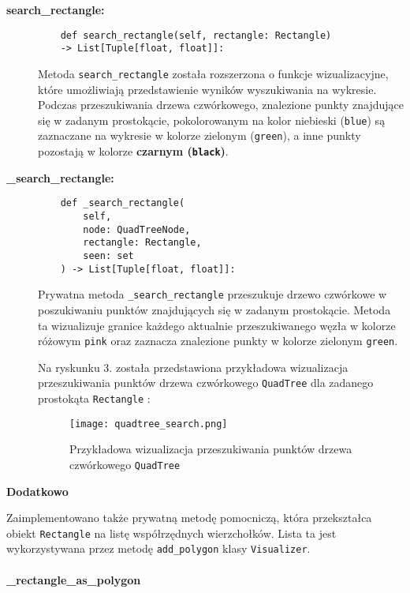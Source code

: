 \documentclass[12pt]{article}
\begin{document}
\begin{description}
    
    \item[\textbf{search\_rectangle:}]
    \begin{verbatim}
    def search_rectangle(self, rectangle: Rectangle)
    -> List[Tuple[float, float]]:
    \end{verbatim}
    Metoda \texttt{search\_rectangle} została rozszerzona o funkcje wizualizacyjne, które umożliwiają przedstawienie wyników wyszukiwania na wykresie. Podczas przeszukiwania drzewa czwórkowego, znalezione punkty znajdujące się w zadanym prostokącie, pokolorowanym na kolor {\color{blue} niebieski (\texttt{blue})} są zaznaczane na wykresie w kolorze {\color[HTML]{006400} zielonym (\texttt{green})}, a inne punkty pozostają w kolorze \textbf{czarnym (\texttt{black})}.
    \item[\textbf{\_search\_rectangle:}]
    \begin{verbatim}
    def _search_rectangle(
        self,
        node: QuadTreeNode,
        rectangle: Rectangle,
        seen: set
    ) -> List[Tuple[float, float]]:
    \end{verbatim}
Prywatna metoda \texttt{\_search\_rectangle} przeszukuje drzewo czwórkowe w poszukiwaniu punktów znajdujących się w zadanym prostokącie. Metoda ta wizualizuje granice każdego aktualnie przeszukiwanego węzła w kolorze {\color{pink} różowym \texttt{pink}} oraz zaznacza znalezione punkty w kolorze {\color[HTML]{006400} zielonym \texttt{green}}.

\noindent Na ryskunku 3. została przedstawiona przykładowa wizualizacja przeszukiwania punktów drzewa czwórkowego \texttt{QuadTree} dla zadanego prostokąta {\color{blue}\texttt{Rectangle}} :

\begin{figure}[ht]
    \centering
    \texttt{[image: quadtree\_search.png]}
    \caption{Przykładowa wizualizacja przeszukiwania punktów drzewa czwórkowego \texttt{QuadTree}}
    \label{fig:quadtree_visualization}
\end{figure}


\end{description}

\pagebreak

\noindent \textbf{Dodatkowo}

\noindent Zaimplementowano także prywatną metodę pomocniczą, która przekształca obiekt \texttt{Rectangle} na listę współrzędnych wierzchołków. Lista ta jest wykorzystywana przez metodę \texttt{add\_polygon} klasy \texttt{Visualizer}.

\paragraph{\_rectangle\_as\_polygon}
\end{document}
